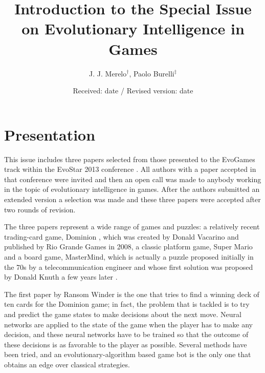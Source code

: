\documentclass[smallextended]{svjour3}
\begin{document}
\title{Introduction to the Special Issue on Evolutionary Intelligence
  in Games}

\author{ J. J. Merelo$^\dag$, Paolo Burelli$^\ddag$}

%
\date{Received: date / Revised version: date}
%
\maketitle
%

\section{Presentation}

This issue includes three papers selected from those presented to the
EvoGames track within the EvoStar 2013 conference \cite{DBLP:conf/evoW/2013a}. All authors with a
paper accepted in that conference were invited and then an open call
was made to anybody working in the topic of evolutionary intelligence
in games. After the authors submitted an extended version a selection
was made and these three papers were accepted after two rounds of
revision.

The three papers represent a wide range of games and puzzles: a
relatively recent
trading-card game, Dominion \cite{mahlmann2012evolving}, which was created by Donald Vacarino and
published by Rio Grande Games in 2008, a classic platform game, Super
Mario \cite{togelius2009super} and a board game, MasterMind, which is
actually a puzzle proposed initially in the 70s by a telecommunication
engineer and whose first solution was proposed by Donald Knuth a few
years later \cite{Knuth}. 

The first paper by Ransom Winder \cite{evin:dominion} is the one that
tries to find a winning deck of ten cards for the Dominion game; in
fact, the problem that is tackled is to try and predict the game
states to make decisions about the next move. Neural networks are
applied to the state of the game when the player has to make any
decision, and these neural networks have to be trained so that the
outcome of these decisions is as favorable to the player as
possible. Several methods have been tried, and an
evolutionary-algorithm based game bot is the only one that obtains an
edge over classical strategies. 
\end{document}
